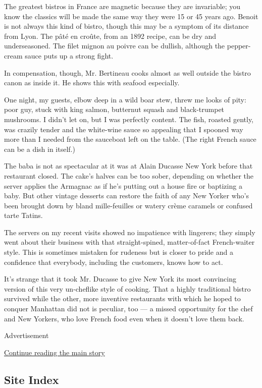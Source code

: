 The greatest bistros in France are magnetic because they are invariable;
you know the classics will be made the same way they were 15 or 45 years
ago. Benoit is not always this kind of bistro, though this may be a
symptom of its distance from Lyon. The pâté en croûte, from an 1892
recipe, can be dry and underseasoned. The filet mignon au poivre can be
dullish, although the pepper-cream sauce puts up a strong fight.

In compensation, though, Mr. Bertineau cooks almost as well outside the
bistro canon as inside it. He shows this with seafood especially.

One night, my guests, elbow deep in a wild boar stew, threw me looks of
pity: poor guy, stuck with king salmon, butternut squash and
black-trumpet mushrooms. I didn't let on, but I was perfectly content.
The fish, roasted gently, was crazily tender and the white-wine sauce so
appealing that I spooned way more than I needed from the sauceboat left
on the table. (The right French sauce can be a dish in itself.)

The baba is not as spectacular at it was at Alain Ducasse New York
before that restaurant closed. The cake's halves can be too sober,
depending on whether the server applies the Armagnac as if he's putting
out a house fire or baptizing a baby. But other vintage desserts can
restore the faith of any New Yorker who's been brought down by bland
mille-feuilles or watery crème caramels or confused tarte Tatins.

The servers on my recent visits showed no impatience with lingerers;
they simply went about their business with that straight-spined,
matter-of-fact French-waiter style. This is sometimes mistaken for
rudeness but is closer to pride and a confidence that everybody,
including the customers, knows how to act.

It's strange that it took Mr. Ducasse to give New York its most
convincing version of this very un-cheflike style of cooking. That a
highly traditional bistro survived while the other, more inventive
restaurants with which he hoped to conquer Manhattan did not is
peculiar, too --- a missed opportunity for the chef and New Yorkers, who
love French food even when it doesn't love them back.

Advertisement

\protect\hyperlink{after-bottom}{Continue reading the main story}

\hypertarget{site-index}{%
\subsection{Site Index}\label{site-index}}

